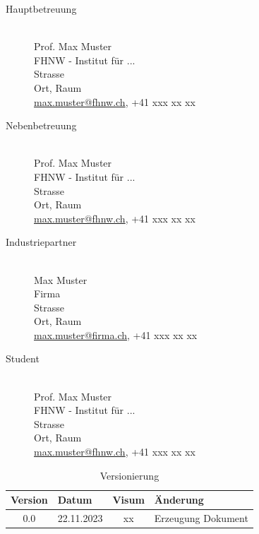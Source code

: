 \begin{description}
    \item[Hauptbetreuung]\hfill\\
        Prof. Max Muster\\
	FHNW - Institut für ...\\
	Strasse\\
        Ort, Raum\\
	\href{mailto:max.muster@fhnw.ch}{max.muster@fhnw.ch}, +41 xxx xx xx\\[12pt]
 
    \item[Nebenbetreuung]\hfill\\
        Prof. Max Muster\\
	FHNW - Institut für ...\\
	Strasse\\
        Ort, Raum\\
	\href{mailto:max.muster@fhnw.ch}{max.muster@fhnw.ch}, +41 xxx xx xx\\[12pt]


    \item[Industriepartner]\hfill\\
        Max Muster\\
	Firma\\
	Strasse\\
        Ort, Raum\\
	\href{mailto:max.muster@firma.ch}{max.muster@firma.ch}, +41 xxx xx xx\\[12pt]
 
 
    \item[Student]\hfill\\
        Prof. Max Muster\\
	FHNW - Institut für ...\\
	Strasse\\
        Ort, Raum\\
	\href{mailto:max.muster@fhnw.ch}{max.muster@fhnw.ch}, +41 xxx xx xx\\[12pt]
\end{description}

\newpage

\begin{table}
	\centering
	\caption{Versionierung}
	\begin{tabular}{c l c l}
		\toprule
		Version & Datum & Visum & Änderung  \\ 
		\hline\midrule
		0.0 & 22.11.2023 & xx & Erzeugung Dokument\\
		\midrule
	\end{tabular} 
\end{table}
